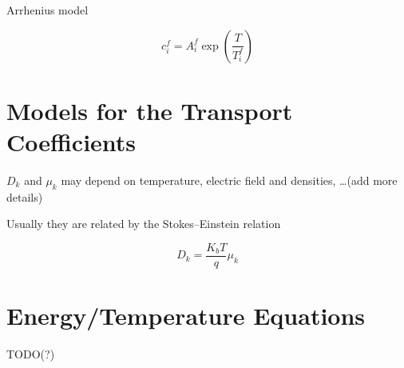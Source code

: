 \documentclass[11pt]{amsart}
\begin{document}
Arrhenius model

$$
c^{f}_i = A^{f}_{i} \exp\left( \dfrac{T}{T^{f}_{i}} \right)
$$

\section{Models for the Transport Coefficients}

$D_{k}$ and $\mu_{k}$ may depend on temperature, electric field and densities, \dots(add more details)

Usually they are related by the Stokes--Einstein relation 

$$
D_{k} = \dfrac{K_{b} T}{q} \mu_{k}
$$

\section{Energy/Temperature Equations}
TODO(?)
\end{document}
